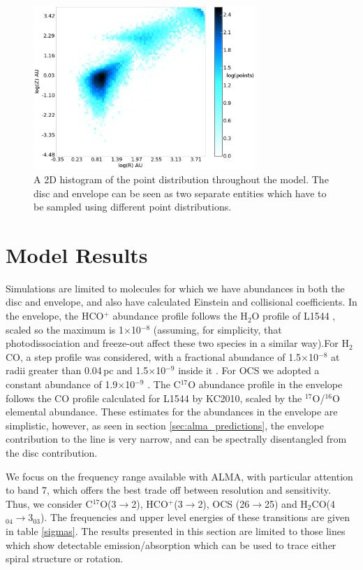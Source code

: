 \documentclass[useAMS,usenatbib]{mn2e}
\begin{document}
\begin{figure}
 \includegraphics[width=84mm]{Figures/model/lime_points_rz_histo2.eps}
 \caption{A 2D histogram of the point distribution throughout the model. The disc and envelope can be seen as two separate entities which have to be sampled using different point distributions.}
 \label{points}
\end{figure}


\section{Model Results} \label{sec:model_results}

Simulations are limited to molecules for which we have abundances in both the disc and envelope, and also have calculated Einstein and collisional coefficients. In the envelope, the HCO$^+$ abundance profile follows the H$_2$O profile of L1544 \citep{Caselli2012}, scaled so the maximum is 1$\times$10$^{-8}$ (assuming, for simplicity, that photodissociation and freeze-out affect these two species in a similar way).For H$_2$CO, a step profile was considered, with a fractional abundance of 1.5$\times$10$^{-8}$ at radii greater than 0.04$\,$pc and 1.5$\times$10$^{-9}$ inside it \citep{Young2004}. For OCS we adopted a constant abundance of 1.9$\times$10$^{-9}$ \citep{Ren2011}. The C$^{17}$O abundance profile in the envelope follows the CO profile calculated for L1544 by KC2010, scaled by the $^{17}$O/$^{16}$O elemental abundance. These estimates for the abundances in the envelope are simplistic, however, as seen in section \ref{sec:alma_predictions}, the envelope contribution to the line is very narrow, and can be spectrally disentangled from the disc contribution.\smallskip

We focus on the frequency range available with ALMA, with particular attention to band 7, which offers the best trade off between resolution and sensitivity. Thus, we consider C$^{17}$O(3$\rightarrow$2), HCO$^+$(3$\rightarrow$2), OCS (26$\rightarrow$25) and H$_2$CO(4$_{04}\rightarrow$3$_{03}$).  The frequencies and upper level energies of these transitions are given in table \ref{sigmas}. The results presented in this section are limited to those lines which show detectable emission/absorption which can be used to trace either spiral structure or rotation.\smallskip
\end{document}
